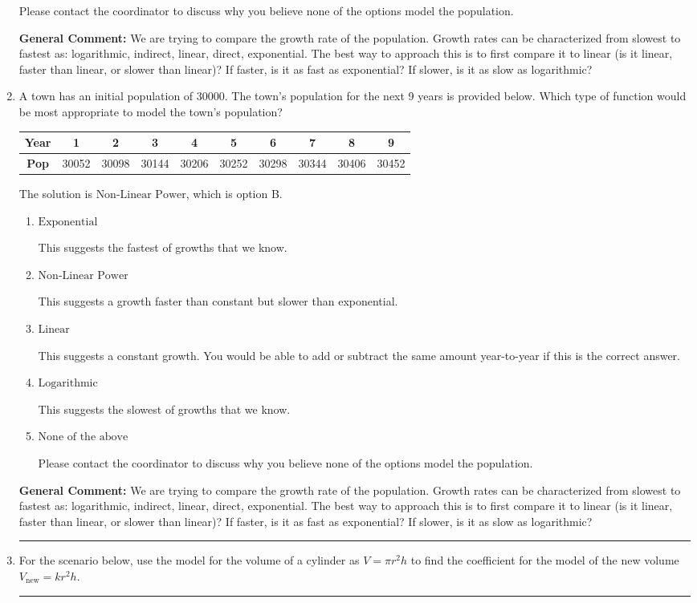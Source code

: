 \documentclass{extbook}[14pt]
\newcommand{\litem}[1]{\item #1

\rule{\textwidth}{0.4pt}}
\begin{document}
\begin{enumerate}
{\begin{enumerate}[label=\Alph*.]
Please contact the coordinator to discuss why you believe none of the options model the population.
\end{enumerate}

\textbf{General Comment:} We are trying to compare the growth rate of the population. Growth rates can be characterized from slowest to fastest as: logarithmic, indirect, linear, direct, exponential. The best way to approach this is to first compare it to linear (is it linear, faster than linear, or slower than linear)? If faster, is it as fast as exponential? If slower, is it as slow as logarithmic?
}
\litem{
A town has an initial population of 30000. The town's population for the next 9 years is provided below. Which type of function would be most appropriate to model the town's population?


\begin{tabular}{c|c|c|c|c|c|c|c|c|c}
\textbf{Year} &1 &2 &3 &4 &5 &6 &7 &8 &9\tabularnewline \hline
\textbf{Pop} &30052 &30098 &30144 &30206 &30252 &30298 &30344 &30406 &30452\end{tabular}The solution is \( \text{Non-Linear Power} \), which is option B.\begin{enumerate}[label=\Alph*.]
\item \( \text{Exponential} \)

This suggests the fastest of growths that we know.
\item \( \text{Non-Linear Power} \)

This suggests a growth faster than constant but slower than exponential.
\item \( \text{Linear} \)

This suggests a constant growth. You would be able to add or subtract the same amount year-to-year if this is the correct answer.
\item \( \text{Logarithmic} \)

This suggests the slowest of growths that we know.
\item \( \text{None of the above} \)

Please contact the coordinator to discuss why you believe none of the options model the population.
\end{enumerate}

\textbf{General Comment:} We are trying to compare the growth rate of the population. Growth rates can be characterized from slowest to fastest as: logarithmic, indirect, linear, direct, exponential. The best way to approach this is to first compare it to linear (is it linear, faster than linear, or slower than linear)? If faster, is it as fast as exponential? If slower, is it as slow as logarithmic?
}
\litem{
For the scenario below, use the model for the volume of a cylinder as $V = \pi r^2 h$ to find the coefficient for the model of the new volume $V_{\text{new}} = k r^2 h$.

}
\end{enumerate}
\end{document}
